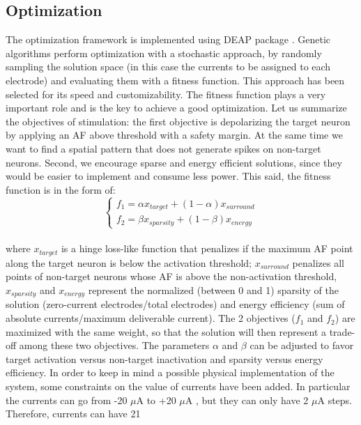\documentclass[conference]{IEEEtran}
\begin{document}
\subsection{Optimization\label{sub:Optimization}}

The optimization framework is implemented using DEAP package \cite{fortin2012deap}.
Genetic algorithms perform optimization with a stochastic approach,
by randomly sampling the solution space (in this case the currents
to be assigned to each electrode) and evaluating them with a fitness
function. This approach has been selected for its speed and customizability.
The fitness function plays a very important role and is the key to
achieve a good optimization. Let us summarize the objectives of stimulation:
the first objective is depolarizing the target neuron by applying
an AF above threshold with a safety margin. At the same time we want
to find a spatial pattern that does not generate spikes on non-target
neurons. Second, we encourage sparse and energy efficient solutions,
since they would be easier to implement and consume less power. This
said, the fitness function is in the form of:
\begin{equation}
\begin{cases}
f_{1}=\alpha x_{target}+(1-\alpha)x_{surround}\\
f_{2}=\beta x_{sparsity}+(1-\beta)x_{energy}
\end{cases}\label{eq:fitness}
\end{equation}
\\
where $x_{target}$ is a hinge loss-like function that penalizes if
the maximum AF point along the target neuron is below the activation
threshold; $x_{surround}$ penalizes all points of non-target neurons
whose AF is above the non-activation threshold, $x_{sparsity}$ and
$x_{energy}$ represent the normalized (between 0 and 1) sparsity
of the solution (zero-current electrodes/total electrodes) and energy
efficiency (sum of absolute currents/maximum deliverable current).
The 2 objectives ($f_{1}$ and $f_{2}$) are maximized with the same
weight, so that the solution will then represent a trade-off among
these two objectives. The parameters $\alpha$ and $\beta$ can be
adjusted to favor target activation versus non-target inactivation
and sparsity versus energy efficiency. In order to keep in mind a
possible physical implementation of the system, some constraints on
the value of currents have been added. In particular the currents
can go from -20 $\mu$A to +20 $\mu$A , but they can
only have 2 $\mu$A steps. Therefore, currents can have 21
\end{document}
